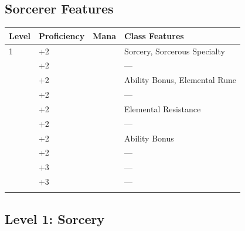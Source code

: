 \documentclass[12pt,letterpaper,twocolumn,openany,nodeprecatedcode,bg=none]{dndbook}
\let\oldsubsection\subsection
\renewcommand{\subsection}[1]{%
  \needspace{5\baselineskip}%
  \oldsubsection{#1}%
}
\begin{document}
\subsection{Sorcerer Features}\label{sorcerer-features}


{\def\LTcaptype{none} %
\begin{table}[!htbp]
\centering
\begin{tabular}{@{}
  >{\raggedright\arraybackslash}p{}
  >{\raggedright\arraybackslash}p{}
  >{\raggedright\arraybackslash}p{}
  >{\raggedright\arraybackslash}p{}@{}}
\toprule\noalign{}
\begin{minipage}[b]{\linewidth}\raggedright
Level
\end{minipage} & \begin{minipage}[b]{\linewidth}\raggedright
Proficiency
\end{minipage} & \begin{minipage}[b]{\linewidth}\raggedright
Mana
\end{minipage} & \begin{minipage}[b]{\linewidth}\raggedright
Class Features
\end{minipage} \\
\midrule\noalign{}
1 & +2 & 2 & Sorcery, Sorcerous Specialty \\
2 & +2 & 3 & --- \\
3 & +2 & 4 & Ability Bonus, Elemental Rune \\
4 & +2 & 5 & --- \\
5 & +2 & 6 & Elemental Resistance \\
6 & +2 & 7 & --- \\
7 & +2 & 8 & Ability Bonus \\
8 & +2 & 9 & --- \\
9 & +3 & 10 & --- \\
10 & +3 & 12 & --- \\
\bottomrule\noalign{}
\end{tabular}
\end{table}
}

\subsection{Level 1: Sorcery}\label{level-1-sorcery}
\end{document}
